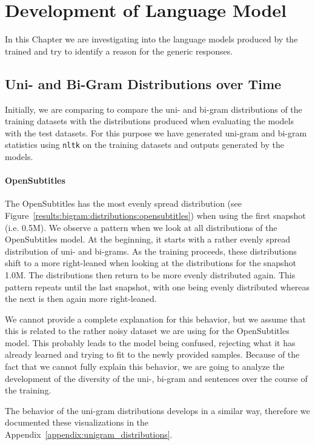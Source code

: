\section{Development of Language Model}
\label{results:development_language_model}
In this Chapter we are investigating into the language models produced by the trained and try to identify a reason for the generic responses.

\subsection{Uni- and Bi-Gram Distributions over Time}
Initially, we are comparing to compare the uni- and bi-gram distributions of the training datasets with the distributions produced when evaluating the models with the test datasets. For this purpose we have generated uni-gram and bi-gram statistics using \texttt{nltk} on the training datasets and outputs generated by the models.

\paragraph{OpenSubtitles} The OpenSubtitles has the most evenly spread distribution (see Figure~\ref{results:bigram:distributions:opensubtitles}) when using the first snapshot (i.e. 0.5M). We observe a pattern when we look at all distributions of the OpenSubtitles model. At the beginning, it starts with a rather evenly spread distribution of uni- and bi-grams. As the training proceeds, these distributions shift to a more right-leaned when looking at the distributions for the snapshot 1.0M. The distributions then return to be more evenly distributed again. This pattern repeats until the last snapshot, with one being evenly distributed whereas the next is then again more right-leaned.

We cannot provide a complete explanation for this behavior, but we assume that this is related to the rather noisy dataset we are using for the OpenSubtitles model. This probably leads to the model being confused, rejecting what it has already learned and trying to fit to the newly provided samples. Because of the fact that we cannot fully explain this behavior, we are going to analyze the development of the diversity of the uni-, bi-gram and sentences over the course of the training.

The behavior of the uni-gram distributions develops in a similar way, therefore we documented these visualizations in the Appendix~\ref{appendix:unigram_distributions}.

